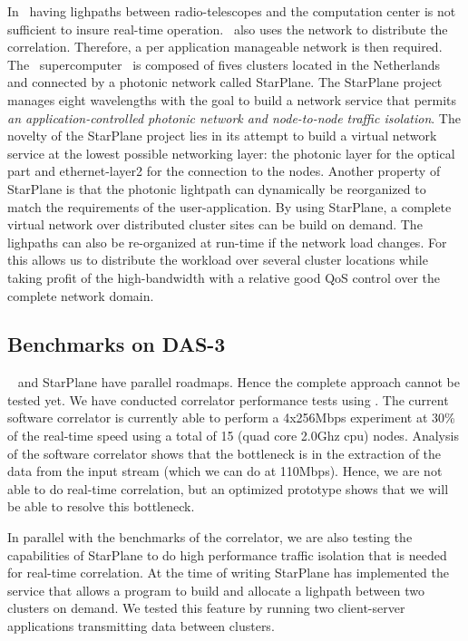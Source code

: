 In \scarie\ having lighpaths between radio-telescopes and the
computation center is not sufficient to insure real-time
operation. \scarie\ also uses the network to distribute the
correlation. Therefore, a per application manageable network is then
required. The \ supercomputer~\cite{das3} is composed of fives
clusters located in the Netherlands and connected by a photonic
network called StarPlane. The StarPlane project manages eight
wavelengths with the goal to build a network service that permits
\textit{an application-controlled photonic network and node-to-node
  traffic isolation}. The novelty of the StarPlane project lies in its
attempt to build a virtual network service at the lowest possible
networking layer: the photonic layer for the optical part and
ethernet-layer2 for the connection to the nodes. Another
property of StarPlane is that the photonic lightpath can dynamically
be reorganized to match the requirements of the user-application. By
using StarPlane, a complete virtual network over distributed cluster
sites can be build on demand. The lighpaths can also be re-organized
at run-time if the network load changes. For \scarie this allows us to
distribute the workload over several cluster locations while taking
profit of the high-bandwidth with a relative good QoS control over the
complete network domain.

\subsection{Benchmarks on DAS-3}
\scarie~ and StarPlane have parallel roadmaps. Hence the complete
approach cannot be tested yet. We have conducted correlator
performance tests using . The current software correlator is
currently able to perform a 4x256Mbps experiment at 30\% of the
real-time speed using a total of 15 (quad core 2.0Ghz cpu)
nodes. Analysis of the software correlator shows that the bottleneck
is in the extraction of the data from the input stream (which we can
do at 110Mbps). Hence, we are not able to do real-time correlation,
but an optimized prototype shows that we will be able to resolve this
bottleneck.

In parallel with the benchmarks of the correlator, we are also testing
the capabilities of StarPlane to do high performance traffic isolation
that is needed for real-time correlation. At the time of writing
StarPlane has implemented the service that allows a program to build
and allocate a lighpath between two clusters on demand. We tested this
feature by running two client-server applications transmitting data
between clusters.

